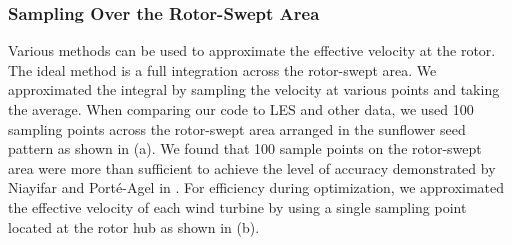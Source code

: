 \documentclass[conf]{new-aiaa}
\begin{document}
\subsubsection{Sampling Over the Rotor-Swept Area}
Various methods can be used to approximate the effective velocity at the rotor. The ideal method is a full integration across the rotor-swept area. We approximated the integral by sampling the velocity at various points and taking the average. 
When comparing our code to LES and other data, we used 100 sampling points across the rotor-swept area arranged in the sunflower seed pattern as shown in (a). We found that 100 sample points on the rotor-swept area were more than sufficient to achieve the level of accuracy demonstrated by Niayifar and Port\'{e}-Agel in \cite{niayifar2016}. For efficiency during optimization, we approximated the effective velocity of each wind turbine by using a single sampling point located at the rotor hub as shown in (b).
\end{document}
